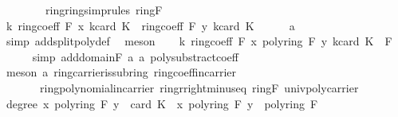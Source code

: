 \begin{isabellebody}
\ \ \ \ \ \ \ \ ring{\isachardot}{\kern0pt}ring{\isacharunderscore}{\kern0pt}simprules{\isacharparenleft}{\kern0pt}{}{\isacharparenright}{\kern0pt}\ ring{\isacharunderscore}{\kern0pt}F{\isacharparenright}{\kern0pt}\isanewline
\ \ \isamarkupfalse%
\ {\isachardoublequoteopen}{\isasymAnd}k{\isachardot}{\kern0pt}\ ring{\isachardot}{\kern0pt}coeff\ F\ x\ {\isacharparenleft}{\kern0pt}k{\isacharplus}{\kern0pt}card\ K{\isacharparenright}{\kern0pt}\ {\isacharequal}{\kern0pt}\ ring{\isachardot}{\kern0pt}coeff\ F\ y\ {\isacharparenleft}{\kern0pt}k{\isacharplus}{\kern0pt}card\ K{\isacharparenright}{\kern0pt}{\isachardoublequoteclose}\isanewline
\ \ \ \ \isamarkupfalse%
\ a{}\ \isamarkupfalse%
\ {\isacharparenleft}{\kern0pt}simp\ add{\isacharcolon}{\kern0pt}split{\isacharunderscore}{\kern0pt}poly{\isacharunderscore}{\kern0pt}def{\isacharparenright}{\kern0pt}\ \isamarkupfalse%
\ meson\isanewline
\ \ \isamarkupfalse%
\ {\isachardoublequoteopen}{\isasymAnd}k{\isachardot}{\kern0pt}\ ring{\isachardot}{\kern0pt}coeff\ F\ {\isacharparenleft}{\kern0pt}x\ {\isasymominus}\isactrlbsub poly{\isacharunderscore}{\kern0pt}ring\ F\isactrlesub \ y{\isacharparenright}{\kern0pt}\ {\isacharparenleft}{\kern0pt}k{\isacharplus}{\kern0pt}card\ K{\isacharparenright}{\kern0pt}\ {\isacharequal}{\kern0pt}\ {\isasymzero}\isactrlbsub F\isactrlesub {\isachardoublequoteclose}\isanewline
\ \ \ \ \isamarkupfalse%
\ {\isacharparenleft}{\kern0pt}simp\ add{\isacharcolon}{\kern0pt}domain{\isacharunderscore}{\kern0pt}F\ a{}\ a{}\ poly{\isacharunderscore}{\kern0pt}substract{\isacharunderscore}{\kern0pt}coeff{\isacharparenright}{\kern0pt}\isanewline
\ \ \ \ \isamarkupfalse%
\ {\isacharparenleft}{\kern0pt}meson\ a{}\ ring{\isachardot}{\kern0pt}carrier{\isacharunderscore}{\kern0pt}is{\isacharunderscore}{\kern0pt}subring\ ring{\isachardot}{\kern0pt}coeff{\isacharunderscore}{\kern0pt}in{\isacharunderscore}{\kern0pt}carrier\ \isanewline
\ \ \ \ \ \ \ ring{\isachardot}{\kern0pt}polynomial{\isacharunderscore}{\kern0pt}in{\isacharunderscore}{\kern0pt}carrier\ ring{\isachardot}{\kern0pt}r{\isacharunderscore}{\kern0pt}right{\isacharunderscore}{\kern0pt}minus{\isacharunderscore}{\kern0pt}eq\ ring{\isacharunderscore}{\kern0pt}F\ univ{\isacharunderscore}{\kern0pt}poly{\isacharunderscore}{\kern0pt}carrier{\isacharparenright}{\kern0pt}\isanewline
\ \ \isamarkupfalse%
\ {\isachardoublequoteopen}degree\ {\isacharparenleft}{\kern0pt}x\ {\isasymominus}\isactrlbsub poly{\isacharunderscore}{\kern0pt}ring\ F\isactrlesub \ y{\isacharparenright}{\kern0pt}\ {\isacharless}{\kern0pt}\ card\ K\ {\isasymor}\ {\isacharparenleft}{\kern0pt}x\ {\isasymominus}\isactrlbsub poly{\isacharunderscore}{\kern0pt}ring\ F\isactrlesub \ y{\isacharparenright}{\kern0pt}\ {\isacharequal}{\kern0pt}\ {\isasymzero}\isactrlbsub poly{\isacharunderscore}{\kern0pt}ring\ F\isactrlesub {\isachardoublequoteclose}\isanewline

\end{isabellebody}
